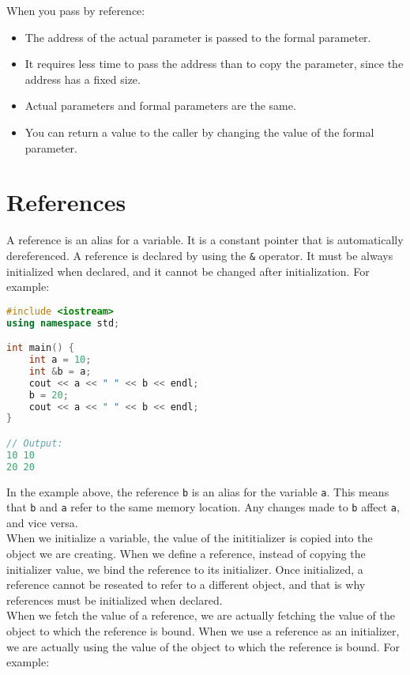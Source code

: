 When you pass by reference:

\begin{itemize}
    \item The address of the actual parameter is passed to the formal parameter.
    \item It requires less time to pass the address than to copy the parameter,
    since the address has a fixed size.
    \item Actual parameters and formal parameters are the same.
    \item You can return a value to the caller by changing the value of the
    formal parameter.
\end{itemize}

\section{References}

A reference is an alias for a variable. It is a constant pointer that is
automatically dereferenced. A reference is declared by using the \texttt{\&}
operator. It must be always initialized when declared, and it cannot be changed
after initialization. For example:\\

\begin{lstlisting}[language=C++]
#include <iostream>
using namespace std;

int main() {
    int a = 10;
    int &b = a;
    cout << a << " " << b << endl;
    b = 20;
    cout << a << " " << b << endl;
}

// Output:
10 10
20 20
\end{lstlisting}

In the example above, the reference \texttt{b} is an alias for the variable
\texttt{a}. This means that \texttt{b} and \texttt{a} refer to the same memory
location. Any changes made to \texttt{b} affect \texttt{a}, and vice versa.\\

When we initialize a variable, the value of the inititializer is copied into
the object we are creating. When we define a reference, instead of copying
the initializer value, we bind the reference to its initializer. Once initialized,
a reference cannot be reseated to refer to a different object, and that is why
references must be initialized when declared.\\

When we fetch the value of a reference, we are actually fetching the value of
the object to which the reference is bound. When we use a reference as an
initializer, we are actually using the value of the object to which the reference
is bound. For example:\\

